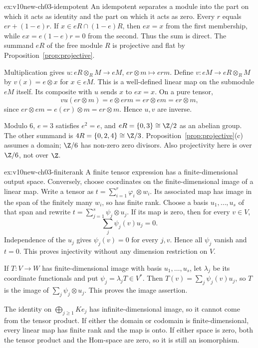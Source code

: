 \begin{solution}{ex:v10new-ch03-idempotent}
\idea An idempotent separates a module into the part on which it acts as identity and the part on which it acts as zero.
\writeup Every $r$ equals $er+(1-e)r$. If $x\in eR\cap(1-e)R$, then $ex=x$ from the first membership, while $ex=e(1-e)r=0$ from the second. Thus the sum is direct. The summand $eR$ of the free module $R$ is projective and flat by Proposition~\ref{prop:projective}.

Multiplication gives $u\colon eR\otimes_RM\to eM$, $er\otimes m\mapsto erm$. Define $v\colon eM\to eR\otimes_RM$ by $v(x)=e\otimes x$ for $x\in eM$. This is a well-defined linear map on the submodule $eM$ itself. Its composite with $u$ sends $x$ to $ex=x$. On a pure tensor,
\[
vu(er\otimes m)=e\otimes erm=er\otimes em=er\otimes m,
\]
since $er\otimes em=e(er)\otimes m=er\otimes m$. Hence $u,v$ are inverse.

Modulo $6$, $e=3$ satisfies $e^2=e$, and $eR=\{0,3\}\cong\Z/2$ as an abelian group. The other summand is $4R=\{0,2,4\}\cong\Z/3$. Proposition~\ref{prop:projective}(c) assumes a domain; $\Z/6$ has non-zero zero divisors. Also projectivity here is over $\Z/6$, not over $\Z$.
\end{solution}

\begin{solution}{ex:v10new-ch03-finiterank}
\idea A finite tensor expression has a finite-dimensional output space. Conversely, choose coordinates on the finite-dimensional image of a linear map.
\writeup Write a tensor as $t=\sum_{i=1}^r\varphi_i\otimes w_i$. Its associated map has image in the span of the finitely many $w_i$, so has finite rank. Choose a basis $u_1,\ldots,u_s$ of that span and rewrite $t=\sum_{j=1}^s\psi_j\otimes u_j$. If its map is zero, then for every $v\in V$,
\[
\sum_j\psi_j(v)u_j=0.
\]
Independence of the $u_j$ gives $\psi_j(v)=0$ for every $j,v$. Hence all $\psi_j$ vanish and $t=0$. This proves injectivity without any dimension restriction on $V$.

If $T\colon V\to W$ has finite-dimensional image with basis $u_1,\ldots,u_s$, let $\lambda_j$ be its coordinate functionals and put $\psi_j=\lambda_jT\in V^*$. Then $T(v)=\sum_j\psi_j(v)u_j$, so $T$ is the image of $\sum_j\psi_j\otimes u_j$. This proves the image assertion.

The identity on $\bigoplus_{j\ge1}Ke_j$ has infinite-dimensional image, so it cannot come from the tensor product. If either the domain or codomain is finite-dimensional, every linear map has finite rank and the map is onto. If either space is zero, both the tensor product and the Hom-space are zero, so it is still an isomorphism.
\end{solution}


